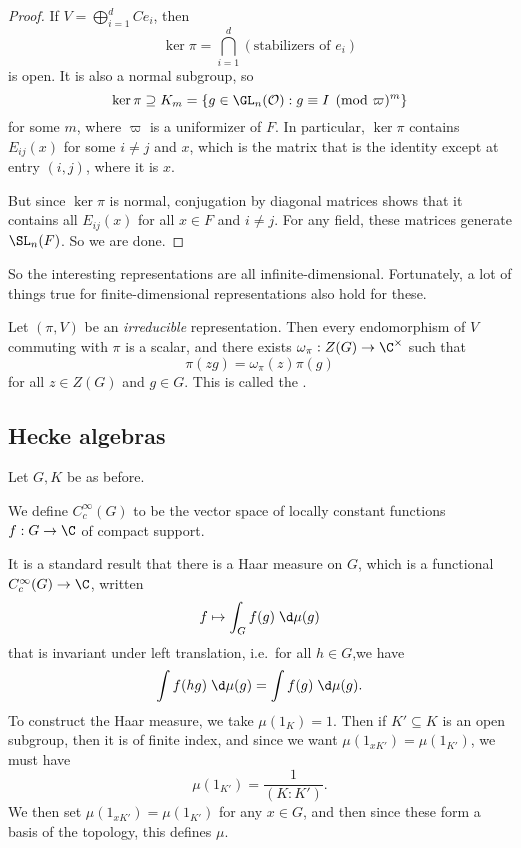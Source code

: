 \documentclass[a4paper]{article}
\begin{document}
\begin{proof}
  If $V = \bigoplus_{i = 1}^d C e_i$, then
  \[
    \ker \pi = \bigcap_{i = 1}^d (\text{stabilizers of }e_i)
  \]
  is open. It is also a normal subgroup, so
  \[
    \ker \pi \supseteq K_m = \{g \in \GL_n(\mathcal{O}) : g \equiv I \pmod \varpi^m\}
  \]
  for some $m$, where $\varpi$ is a uniformizer of $F$. In particular, $\ker \pi$ contains $E_{ij}(x)$ for some $i \not= j$ and $x$, which is the matrix that is the identity except at entry $(i, j)$, where it is $x$.

  But since $\ker \pi$ is normal, conjugation by diagonal matrices shows that it contains all $E_{ij}(x)$ for all $x \in F$ and $i \not= j$. For any field, these matrices generate $\SL_n(F)$. So we are done.
\end{proof}
So the interesting representations are all infinite-dimensional. Fortunately, a lot of things true for finite-dimensional representations also hold for these.

\begin{lemma}
  Let $(\pi, V)$ be an \emph{irreducible} representation. Then every endomorphism of $V$ commuting with $\pi$ is a scalar, and there exists $\omega_\pi: Z(G) \to \C^\times$ such that
  \[
    \pi(zg) = \omega_\pi(z) \pi(g)
  \]
  for all $z \in Z(G)$ and $g \in G$. This is called the . \end{lemma}
\subsection{Hecke algebras}
Let $G, K$ be as before.
\begin{defi}[$C_c^\infty(G)$]
  We define $C_c^\infty(G)$ to be the vector space of locally constant functions $f: G \to \C$ of compact support.
\end{defi}
It is a standard result that there is a Haar measure on $G$, which is a functional $C_c^\infty(G) \to \C$, written
\[
  f \mapsto \int_G f(g) \;\d \mu (g)
\]
that is invariant under left translation, i.e.\ for all $h \in G$,we have
\[
  \int f(hg) \;\d \mu(g) = \int f(g)\;\d \mu(g).
\]
To construct the Haar measure, we take $\mu(1_K) = 1$. Then if $K' \subseteq K$ is an open subgroup, then it is of finite index, and since we want $\mu(1_{xK'}) = \mu(1_{K'})$, we must have
\[
  \mu(1_{K'}) = \frac{1}{(K:K')}.
\]
We then set $\mu(1_{xK'}) = \mu(1_{K'})$ for any $x \in G$, and then since these form a basis of the topology, this defines $\mu$.
\end{document}
